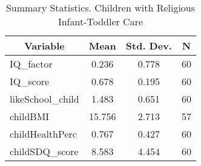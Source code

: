 
\begin{table}[htbp]\centering \caption{Summary Statistics. Children with Religious Infant-Toddler Care \label{schoolChildasiloReli}}
\begin{tabular}{l c c  c}\hline\hline
\multicolumn{1}{c}{\textbf{Variable}} & \textbf{Mean}
 & \textbf{Std. Dev.} & \textbf{N}\\ \hline
IQ\_factor & 0.236 & 0.778  & 60\\
IQ\_score & 0.678 & 0.195  & 60\\
likeSchool\_child & 1.483 & 0.651  & 60\\
childBMI & 15.756 & 2.713  & 57\\
childHealthPerc & 0.767 & 0.427  & 60\\
childSDQ\_score & 8.583 & 4.454  & 60\\
\hline\end{tabular}
\end{table}

